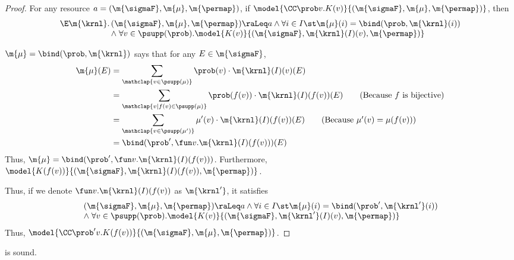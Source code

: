\documentclass[acmsmall,nonacm,screen,appendix]{acmart}
\begin{document}
\begin{proof}
  For any resource $a = (\m{\sigmaF}, \m{\mu}, \m{\permap})$,
  if $ \model{\CC\prob v.K(v)}{(\m{\sigmaF}, \m{\mu}, \m{\permap})}$,
  then
  \begin{align*}
    \begin{array}[t]{@{}r@{\,}l@{}}
      \E \m{\krnl}.
      & (\m{\sigmaF}, \m{\mu}, \m{\permap}) \raLeq a
      \land
        \forall i\in I\st
        \m{\mu}(i) = \bind(\prob, \m{\krnl}(i))
      \\ & \land \;
        \forall v \in \psupp(\prob).
          \model{K(v)}{ (\m{\sigmaF}, \m{\krnl}(I)(v), \m{\permap}) }
    \end{array}
  \end{align*}

  $\m{\mu} = \bind(\prob, \m{\krnl})$  says that for any
  $E \in \m{\sigmaF}$,
  \begin{align}
    \m{\mu}(E)
    &= \sum_{\mathclap{v \in \psupp(\mu)}} \prob(v) \cdot \m{\krnl}(I)(v)(E) \notag \\
    &= \sum_{\mathclap{v \mid f(v) \in \psupp(\mu)}} \prob(f(v)) \cdot \m{\krnl}(I)(f(v))(E) \tag{Because $f$ is bijective}\\
    &= \sum_{\mathclap{v \in \psupp(\mu')}} \mu'(v) \cdot \m{\krnl}(I)(f(v))(E) \tag{Because $\mu'(v) = \mu(f(v))$} \\
    &= \bind(\prob', \fun v . \m{\krnl}(I)(f(v)))(E) \notag
  \end{align}
  Thus, $\m{\mu} = \bind(\prob', \fun v . \m{\krnl}(I)(f(v)))$.
  Furthermore, $\model{K(f(v))}{ (\m{\sigmaF}, \m{\krnl}(I)(f(v)), \m{\permap}) }$.

  Thus, if we denote $\fun v . \m{\krnl}(I)(f(v))$ as $\m{\krnl'}$, it satisfies
  \begin{align*}
    \begin{array}[t]{@{}r@{\,}l@{}}
      & (\m{\sigmaF}, \m{\mu}, \m{\permap}) \raLeq a
      \land
        \forall i\in I\st
        \m{\mu}(i) = \bind(\prob', \m{\krnl'}(i))
      \\ & \land \;
        \forall v \in \psupp(\prob).
          \model{K(v)}{ (\m{\sigmaF}, \m{\krnl'}(I)(v), \m{\permap})}
    \end{array}
  \end{align*}
  Thus, $ \model{\CC\prob' v.K(f(v))}{(\m{\sigmaF}, \m{\mu}, \m{\permap})}$.
\end{proof}
 \begin{lemma}
\label{proof:sure-str-convex}
   is sound.
\end{lemma}
\end{document}
